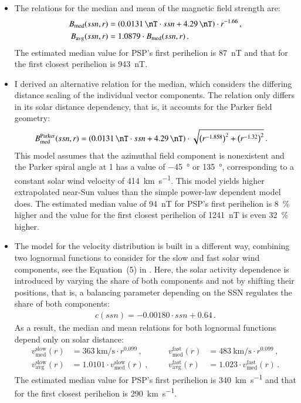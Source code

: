 \begin{itemize}
	\item The relations for the median and mean of the magnetic field strength are:
	\begin{align*}
		B_\text{med}(ssn,r) &= \left(\SI{0.0131}{\nT} \cdot ssn + \SI{4.29}{\nT}\right) \cdot r^{-1.66}	\,,\\
		B_\text{avg}(ssn,r) &= 1.0879 \cdot B_\text{med}(ssn,r)	\,.
	\end{align*}
	 The estimated median value for PSP's first perihelion is \SI{87}{\nano\tesla} and that for the first closest perihelion is \SI{943}{\nano\tesla}.
	
	\item I derived an alternative relation for the median, which considers the differing distance scaling of the individual vector components. The relation only differs in its solar distance dependency, that is, it accounts for the Parker field geometry:
	\begin{align*}
		B^\text{Parker}_\text{med}(ssn,r) &= \left(\SI{0.0131}{\nT} \cdot ssn + \SI{4.29}{\nT}\right) \cdot \sqrt{\left(r^{-1.858}\right)^2 + \left(r^{-1.32}\right)^2}	\,.
	\end{align*}
	This model assumes that the azimuthal field component is nonexistent and the Parker spiral angle at \SI{1}{\au} has a value of \SI{-45}{\degree} or \SI{135}{\degree}, corresponding to a constant solar wind velocity of \SI{414}{\km\per\s}.
	This model yields higher extrapolated near-Sun values than the simple power-law dependent model does. The estimated median value of \SI{94}{\nano\tesla} for PSP's first perihelion is \SI{8}{\%} higher and the value for the first closest perihelion of \SI{1241}{\nano\tesla} is even \SI{32}{\%} higher.
	
	\item The model for the velocity distribution is built in a different way, combining two lognormal functions to consider for the slow and fast solar wind components, see the Equation~(5) in \citet{Venzmer2018}. Here, the solar activity dependence is introduced by varying the share of both components and not by shifting their positions, that is, a balancing parameter depending on the SSN regulates the share of both components:
	\begin{align*}
		c(ssn) = -0.00180 \cdot ssn + 0.64	\,.
	\end{align*}
	As a result, the median and mean relations for both lognormal functions depend only on solar distance:
	\begin{align*}
		v_\text{med}^\text{slow}(r) &= \SI{363}{\km\per\s} \cdot r^{0.099}	\,,&    &       &v_\text{med}^\text{fast}(r) &= \SI{483}{\km\per\s} \cdot r^{0.099}	\,,\\
		v_\text{avg}^\text{slow}(r) &= 1.0101 \cdot v_\text{med}^\text{slow}(r)	\,,&    &       &v_\text{avg}^\text{fast}(r) &= 1.023 \cdot v_\text{med}^\text{fast}(r)	\,.
	\end{align*}
	 The estimated median value for PSP's first perihelion is \SI{340}{\km\per\s} and that for the first closest perihelion is \SI{290}{\km\per\s}.
	

\end{itemize}
